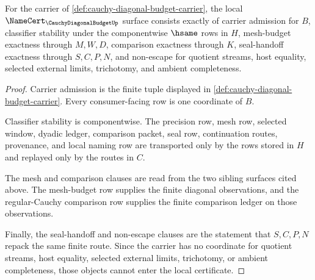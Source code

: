 \begin{theorem}
\label{thm:cauchy-diagonal-budget-namecert-obligations}
For the carrier of \autoref{def:cauchy-diagonal-budget-carrier}, the local $\NameCert_{\CauchyDiagonalBudgetUp}$ surface consists exactly of carrier admission for $B$, classifier stability under the componentwise $\hsame$ rows in $H$, mesh-budget exactness through $M,W,D$, comparison exactness through $K$, seal-handoff exactness through $S,C,P,N$, and non-escape for quotient streams, host equality, selected external limits, trichotomy, and ambient completeness.
\end{theorem}
\begin{proof}
Carrier admission is the finite tuple displayed in \autoref{def:cauchy-diagonal-budget-carrier}. Every consumer-facing row is one coordinate of $B$.

Classifier stability is componentwise. The precision row, mesh row, selected window, dyadic ledger, comparison packet, seal row, continuation routes, provenance, and local naming row are transported only by the rows stored in $H$ and replayed only by the routes in $C$.

The mesh and comparison clauses are read from the two sibling surfaces cited above. The mesh-budget row supplies the finite diagonal observations, and the regular-Cauchy comparison row supplies the finite comparison ledger on those observations.

Finally, the seal-handoff and non-escape clauses are the statement that $S,C,P,N$ repack the same finite route. Since the carrier has no coordinate for quotient streams, host equality, selected external limits, trichotomy, or ambient completeness, those objects cannot enter the local certificate.
\end{proof}

